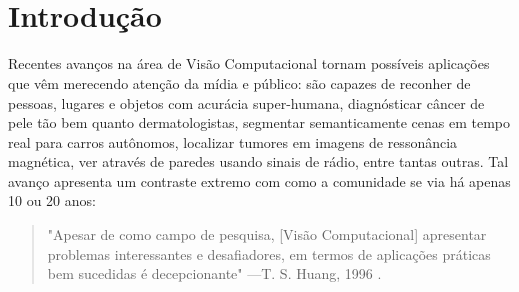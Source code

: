 \documentclass[
12pt, %
a4paper, %
onecolumn, %
]{article}
\begin{document}
\pagestyle{myheadings} %


\thispagestyle{plain} %

\printcover %

\begin{center}

  \horrule{0.5pt} \\[0.4cm] %

  \bigskip

  \textbf{\Large{\doctitle}}
  
  \bigskip
  
  \docauthor

  \bigskip
  

  \horrule{2pt} \\[0.5cm] %

\end{center}

\thispagestyle{plain}
\setcounter{page}{2}
\onehalfspacing

\section{Introdução}


Recentes avanços na área de Visão Computacional tornam possíveis aplicações que vêm merecendo atenção da mídia e público:  são capazes de reconher de pessoas, lugares e objetos com acurácia super-humana\cite{fei}, diagnósticar câncer de pele tão bem quanto dermatologistas\cite{fred}, segmentar semanticamente cenas em tempo real para carros autônomos, localizar tumores em imagens de ressonância magnética, ver através de paredes usando sinais de rádio, entre tantas outras. Tal avanço apresenta um contraste extremo com como a comunidade se via há apenas 10 ou 20 anos: 
\begin{quote}"Apesar de como campo de pesquisa, [Visão Computacional] apresentar problemas interessantes e desafiadores, em termos de aplicações práticas bem sucedidas é decepcionante" \hfill ---T. S. Huang,  1996 \cite{huang1996}.  \end{quote}
\end{document}
